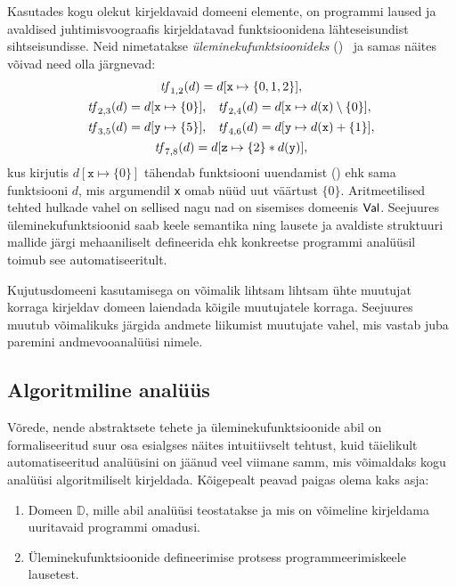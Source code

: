 \documentclass[../thesis.tex]{subfiles}
\begin{document}
Kasutades kogu olekut kirjeldavaid domeeni elemente, on programmi laused ja avaldised juhtimisvoograafis kirjeldatavad funktsioonidena lähteseisundist sihtseisundisse. Neid nimetatakse \emph{üleminekufunktsioonideks} ()~\cite{vojdani_magister} ja samas näites võivad need olla järgnevad:
\begin{gather*}
	\tf_{1,2}(d) = d[\texttt{x} \mapsto \{0, 1, 2\}], \\
\begin{align*} %
	\tf_{2,3}(d) &= d[\texttt{x} \mapsto \{0\}], &
	\tf_{2,4}(d) &= d[\texttt{x} \mapsto d(\texttt{x}) \setminus \{0\}], \\
	\tf_{3,5}(d) &= d[\texttt{y} \mapsto \{5\}], &
	\tf_{4,6}(d) &= d[\texttt{y} \mapsto d(\texttt{x}) + \{1\}],
\end{align*} \\
	\tf_{7,8}(d) = d[\texttt{z} \mapsto \{2\} * d(\texttt{y})],
\end{gather*}
kus kirjutis $d[\texttt{x} \mapsto \{0\}]$ tähendab funktsiooni uuendamist () ehk sama funktsiooni $d$, mis argumendil \texttt{x} omab nüüd uut väärtust $\{0\}$. Aritmeetilised tehted hulkade vahel on sellised nagu nad on sisemises domeenis $\mathsf{Val}$.
Seejuures üleminekufunktsioonid saab keele semantika ning lausete ja avaldiste struktuuri mallide järgi mehaaniliselt defineerida ehk konkreetse programmi analüüsil toimub see automatiseeritult.

Kujutusdomeeni kasutamisega on võimalik lihtsam lihtsam ühte muutujat korraga kirjeldav domeen laiendada kõigile muutujatele korraga. Seejuures muutub võimalikuks järgida andmete liikumist muutujate vahel, mis vastab juba paremini andmevooanalüüsi nimele.


\subsection{Algoritmiline analüüs}
Võrede, nende abstraktsete tehete ja üleminekufunktsioonide abil on formaliseeritud suur osa esialgses näites intuitiivselt tehtust, kuid täielikult automatiseeritud analüüsini on jäänud veel viimane samm, mis võimaldaks kogu analüüsi algoritmiliselt kirjeldada. Kõigepealt peavad paigas olema kaks asja:
\begin{enumerate}[nosep]
	\item Domeen $\mathbb{D}$, mille abil analüüsi teostatakse ja mis on võimeline kirjeldama uuritavaid programmi omadusi.
	\item Üleminekufunktsioonide defineerimise protsess programmeerimiskeele lausetest.
\end{enumerate}
\end{document}
